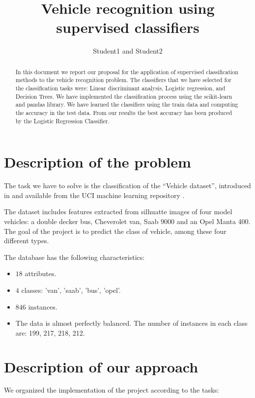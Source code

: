 \documentclass{article} %
\title{Vehicle recognition using supervised classifiers}
\author{Student1 and Student2}
\begin{document}
\maketitle



\begin{abstract}
  In this document we report our proposal for the application of supervised classification methods to the vehicle recognition problem. The classifiers that we have selected for the classification tasks were: Linear discriminant analysis, Logistic regression, and Decision Trees. We have implemented the classification process using the scikit-learn and pandas library. We have learned the classifiers using the train data and computing the accuracy in the test data. From our results the best accuracy has been produced by the Logistic Regression Classifier.
\end{abstract}

\section{Description of the problem}
 
 The task we have to solve is the classification of the  ``Vehicle dataset'', introduced in \cite{Siebert:1987} and available from the UCI machine learning repository \cite{Blake_and_Merz:1998}. 
 
 The dataset includes features extracted from silhuatte images of four model vehicles:  a double decker bus, Cheverolet van, Saab 9000 and an Opel Manta 400.  The goal of the project is to predict the class of vehicle, among these four different types.

  The database has the following characteristics: 

\begin{itemize}
  \item $18$ attributes.
  \item $4$ classes: 'van', 'saab', 'bus', 'opel'.
  \item $846$ instances. 
  \item The data is almost perfectly balanced. The number of instances in each class are: 199, 217, 218, 212.
\end{itemize}


\section{Description of our approach}
  
 We organized the implementation of the project according to the tasks:
\end{document}
